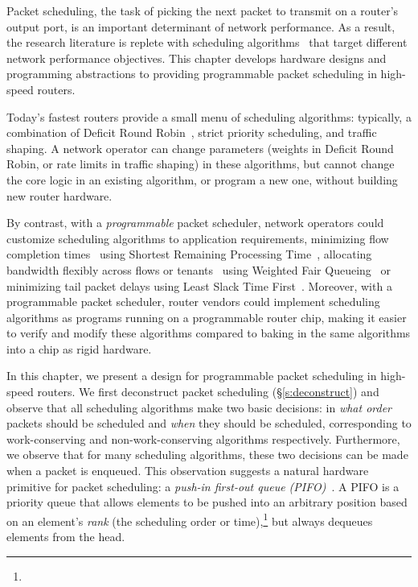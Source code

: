 Packet scheduling, the task of picking the next packet to transmit on a
router's output port, is an important determinant of network performance. As a
result, the research literature is replete with scheduling
algorithms~\cite{wfq, srr, lstf, drr, pFabric} that target different network
performance objectives.  This chapter develops hardware designs and programming
abstractions to providing programmable packet scheduling in high-speed
routers.

 Today's fastest routers provide a small menu of
scheduling algorithms: typically, a combination of Deficit Round
Robin~\cite{drr}, strict priority scheduling, and traffic shaping. A network
operator can change parameters (\eg weights in Deficit Round Robin, or rate
limits in traffic shaping) in these algorithms, but cannot change the core
logic in an existing algorithm, or program a new one, without building new
router hardware.

By contrast, with a {\em programmable} packet scheduler, network operators
could customize scheduling algorithms to application requirements, \eg
minimizing flow completion times~\cite{pFabric} using Shortest Remaining
Processing Time~\cite{srpt}, allocating bandwidth flexibly across flows or
tenants~\cite{eyeq, faircloud} using Weighted Fair Queueing~\cite{wfq} or
minimizing tail packet delays using Least Slack Time First~\cite{lstf}.
Moreover, with a programmable packet scheduler, router vendors could implement
scheduling algorithms as programs running on a programmable router chip, making
it easier to verify and modify these algorithms compared to baking in the same
algorithms into a chip as rigid hardware.

In this chapter, we present a design for programmable packet scheduling in
high-speed routers. We first deconstruct packet scheduling
(\S\ref{s:deconstruct}) and observe that all scheduling algorithms make two
basic decisions: in {\em what order} packets should be scheduled and {\em when}
they should be scheduled, corresponding to work-conserving and
non-work-conserving algorithms respectively.  Furthermore, we observe that for
many scheduling algorithms, these two decisions can be made when a packet is
enqueued. This observation suggests a natural hardware primitive for packet
scheduling: a {\em push-in first-out queue (PIFO)}~\cite{pifo}. A PIFO is a
priority queue that allows elements to be pushed into an arbitrary position
based on an element's {\em rank} (the scheduling order or
time),\footnote{} but always dequeues elements from the head.

